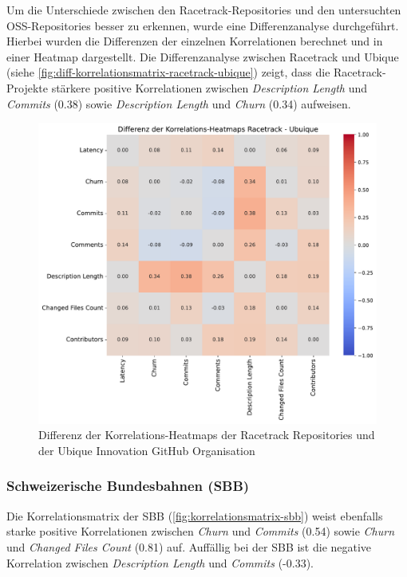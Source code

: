 \newpage
Um die Unterschiede zwischen den Racetrack-Repositories und den untersuchten OSS-Repositories besser zu erkennen, wurde eine Differenzanalyse durchgeführt. Hierbei wurden die Differenzen der einzelnen Korrelationen berechnet und in einer Heatmap dargestellt. Die Differenzanalyse zwischen Racetrack und Ubique (siehe \autoref{fig:diff-korrelationsmatrix-racetrack-ubique}) zeigt, dass die Racetrack-Projekte stärkere positive Korrelationen zwischen \textit{Description Length} und \textit{Commits} (0.38) sowie \textit{Description Length} und \textit{Churn} (0.34) aufweisen.

\begin{figure}[htbp]
\includegraphics[width=\textwidth]{Figures/diff-korrelationsmatrix-racetrack-ubique.pdf}
\caption{Differenz der Korrelations-Heatmaps der Racetrack Repositories und der Ubique Innovation GitHub Organisation}
\label{fig:diff-korrelationsmatrix-racetrack-ubique}
\end{figure}

\newpage
\subsubsection{Schweizerische Bundesbahnen (SBB)}
Die Korrelationsmatrix der SBB (\autoref{fig:korrelationsmatrix-sbb}) weist ebenfalls starke positive Korrelationen zwischen \textit{Churn} und \textit{Commits} (0.54) sowie \textit{Churn} und \textit{Changed Files Count} (0.81) auf. Auffällig bei der SBB ist die negative Korrelation zwischen \textit{Description Length} und \textit{Commits} (-0.33).

